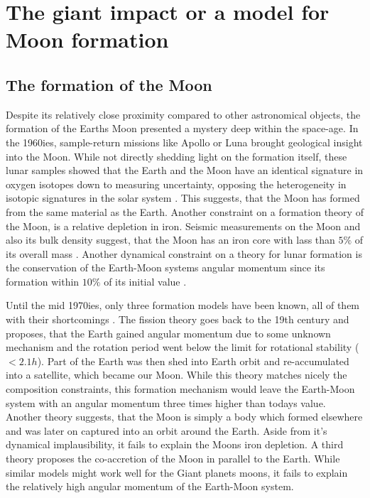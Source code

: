 \cleardoublepage
\chapter{The giant impact or a model for Moon formation}
\label{ch05}
\graphicspath{{./05figs/}}

\section{The formation of the Moon}
Despite its relatively close proximity compared to other astronomical objects, the formation of the Earths Moon presented a mystery deep within the space-age. In the 1960ies, sample-return missions like Apollo or Luna brought geological insight into the Moon. While not directly shedding light on the formation itself, these lunar samples showed that the Earth and the Moon have an identical signature in oxygen isotopes down to measuring uncertainty, opposing the heterogeneity in isotopic signatures in the solar system \citep{Wiechert:2001p3543}. This suggests, that the Moon has formed from the same material as the Earth. Another constraint on a formation theory of the Moon, is a relative depletion in iron. Seismic measurements on the Moon and also its bulk density suggest, that the Moon has an iron core with lass than $5 \%$ of its overall mass \citep{2011Sci...331..309W}. Another dynamical constraint on a theory for lunar formation is the conservation of the Earth-Moon systems angular momentum since its formation within $10\%$ of its initial value \citep{Canup:2001p3295}. 

Until the mid 1970ies, only three formation models have been known, all of them with their shortcomings \citep{Stevenson:1987p3540}. The fission theory goes back to the 19th century and proposes, that the Earth gained angular momentum due to some unknown mechanism and the rotation period went below the limit for rotational stability ($< 2.1h$). Part of the Earth was then shed into Earth orbit and re-accumulated into a satellite, which became our Moon. While this theory matches nicely the composition constraints, this formation mechanism would leave the Earth-Moon system with an angular momentum three times higher than todays value. Another theory suggests, that the Moon is simply a body which formed elsewhere and was later on captured into an orbit around the Earth. Aside from it's dynamical implausibility, it fails to explain the Moons iron depletion. A third theory proposes the co-accretion of the Moon in parallel to the Earth. While similar models might work well for the Giant planets moons, it fails to explain the relatively high angular momentum of the Earth-Moon system.

